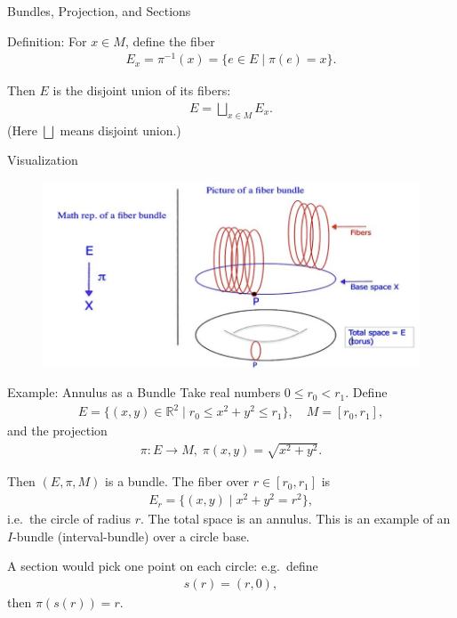 \begin{frame}{Bundles, Projection, and Sections}

\begin{block}{Definition:} For \(x \in M\), define the fiber
\begin{align*}
E_x = \pi^{-1}(x) = \{ e \in E \mid \pi(e) = x \}.
\end{align*}

Then \(E\) is the disjoint union of its fibers:
\begin{align*}
E = \bigsqcup_{x \in M} E_x.
\end{align*}
(Here \(\bigsqcup\) means disjoint union.)
\end{block}

\end{frame}


\begin{frame}{Visualization}
\begin{figure}
    \centering
    \includegraphics[width=0.85\linewidth]{Image5.png}
\end{figure}
    
\end{frame}


\begin{frame}{Example: Annulus as a Bundle}
Take real numbers \(0 \le r_0 < r_1\). Define
\begin{align*}
E = \{ (x,y) \in \mathbb{R}^2 \mid r_0 \le x^2 + y^2 \le r_1 \}, \quad
M = [r_0, r_1],
\end{align*}
and the projection
\begin{align*}
\pi: E \to M,\; \pi(x,y) = \sqrt{x^2 + y^2}.
\end{align*}

Then \((E, \pi, M)\) is a bundle. The fiber over \(r\in [r_0,r_1]\) is
\begin{align*}
E_r = \{ (x,y) \mid x^2 + y^2 = r^2 \},
\end{align*}
i.e.\ the circle of radius \(r\). The total space is an annulus. This is an example of an \(I\)-bundle (interval-bundle) over a circle base.

A section would pick one point on each circle: e.g.\ define 
\begin{align*}
s(r) = (r, 0),
\end{align*}
then \(\pi(s(r)) = r\).
\end{frame}

